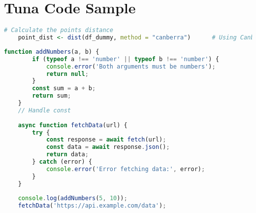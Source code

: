 \section{Tuna Code Sample}

\begin{lstlisting}[language=R, caption=Example R Code to Calculate Distance]
	# Calculate the points distance
	point_dist <- dist(df_dummy, method = "canberra")      # Using Canberra distance
\end{lstlisting}


\begin{lstlisting}[language=Javascript, caption=Example JS Code]
	function addNumbers(a, b) {
		if (typeof a !== 'number' || typeof b !== 'number') {
			console.error('Both arguments must be numbers');
			return null;
		}
		const sum = a + b;
		return sum;
	}
	// Handle const
	
	async function fetchData(url) {
		try {
			const response = await fetch(url);
			const data = await response.json();
			return data;
		} catch (error) {
			console.error('Error fetching data:', error);
		}
	}
	
	console.log(addNumbers(5, 10));
	fetchData('https://api.example.com/data');
\end{lstlisting}